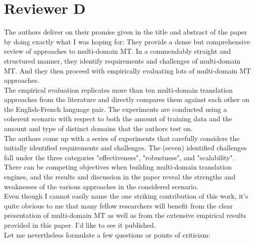 \documentclass[12pt,times,a4paper,twoside]{article}
\theoremstyle{definition}
\begin{document}
\section*{Reviewer D}
The authors deliver on their promise given in the title and abstract of the paper by doing exactly what I was hoping for: They provide a dense but comprehensive review of approaches to multi-domain MT. In a commendably straight and structured manner, they identify requirements and challenges of multi-domain MT. And they then proceed with empirically evaluating lots of multi-domain MT approaches.
\\
The empirical evaluation replicates more than ten multi-domain translation approaches from the literature and directly compares them against each other on the English-French language pair. The experiments are conducted using a coherent scenario with respect to both the amount of training data and the amount and type of distinct domains that the authors test on.
\\
The authors come up with a series of experiments that carefully considers the initially identified requirements and challenges. The (seven) identified challenges fall under the three categories "effectiveness", "robustness", and "scalability". There can be competing objectives when building multi-domain translation engines, and the results and discussion in the paper reveal the strengths and weaknesses of the various approaches in the considered scenario.
\\
Even though I cannot easily name the one striking contribution of this work, it's quite obvious to me that many fellow researchers will benefit from the clear presentation of multi-domain MT as well as from the extensive empirical results provided in this paper. I'd like to see it published.
\\
Let me nevertheless formulate a few questions or points of criticism:
\\
\end{document}
